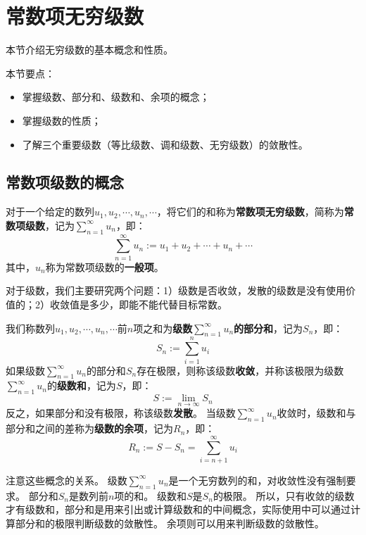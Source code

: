 \section{常数项无穷级数}

本节介绍无穷级数的基本概念和性质。

本节要点：
\begin{itemize}
    \item 掌握级数、部分和、级数和、余项的概念；
    \item 掌握级数的性质；
    \item 了解三个重要级数（等比级数、调和级数、无穷级数）的敛散性。
\end{itemize}

\subsection{常数项级数的概念}

\begin{definition}[常数项级数]
对于一个给定的数列$u_1,u_2,\cdots ,u_n,\cdots $，将它们的和称为{\bf 常数项无穷级数}，简称为{\bf 常数项级数}，记为$\sum_{n=1}^{\infty}{u_n}$，即：
\[
\sum_{n=1}^{\infty}{u_n}:=u_1+u_2+\cdots +u_n+\cdots
\]
其中，$u_n$称为常数项级数的{\bf 一般项}。
\end{definition}

对于级数，我们主要研究两个问题：1）级数是否收敛，发散的级数是没有使用价值的；2）收敛值是多少，即能不能代替目标常数。

\begin{definition}
我们称数列$u_1,u_2,\cdots ,u_n,\cdots $前$n$项之和为{\bf 级数$\sum_{n=1}^{\infty}{u_n}$的部分和}，记为$S_n$，即：
\[
S_n:=\sum_{i=1}^n{u_i}
\]
如果级数$\sum_{n=1}^{\infty}{u_n}$的部分和$S_n$存在极限，则称该级数{\bf 收敛}，并称该极限为级数$\sum_{n=1}^{\infty}{u_n}$的{\bf 级数和}，记为$S$，即：
\[
S:=\underset{n\rightarrow \infty}{\lim}S_n
\]
反之，如果部分和没有极限，称该级数{\bf 发散}。
当级数$\sum_{n=1}^{\infty}{u_n}$收敛时，级数和与部分和之间的差称为{\bf 级数的余项}，记为$R_n$，即：
\[
R_n:=S-S_n=\sum_{i=n+1}^{\infty}{u_i}
\]
\end{definition}

注意这些概念的关系。
级数$\sum_{n=1}^{\infty}{u_n}$是一个无穷数列的和，对收敛性没有强制要求。
部分和$S_n$是数列前$n$项的和。
级数和$S$是$S_n$的极限。
所以，只有收敛的级数才有级数和，部分和是用来引出或计算级数和的中间概念，实际使用中可以通过计算部分和的极限判断级数的敛散性。
余项则可以用来判断级数的敛散性。

